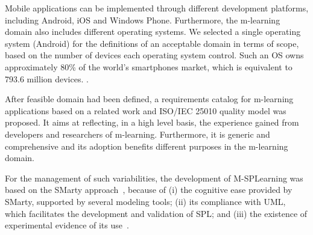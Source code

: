 Mobile applications can be implemented through different development platforms, including Android, iOS and Windows Phone. Furthermore, the m-learning domain also includes different operating systems. We selected a single operating system (Android) for the definitions of an acceptable domain in terms of scope, based on the number of devices each operating system control. Such an OS owns approximately 80\% of the world's smartphones market, which is equivalent to 793.6 million devices. \cite{llamas14}.

After feasible domain had been defined, a requirements catalog for m-learning applications based on a related work \cite{filho13} and ISO/IEC 25010 quality model was proposed. It aims at reflecting, in a high level basis, the experience gained from developers and researchers of m-learning. Furthermore, it is generic and comprehensive and its adoption benefits different purposes in the m-learning domain. 

For the management of such variabilities, the development of M-SPLear\allowbreak ning was based on the SMarty approach~\cite{oliveirajr10}, because of (i) the cognitive ease provided by SMarty, supported by several modeling tools; (ii) its compliance with UML, which facilitates the development and validation of SPL; and (iii) the existence of experimental evidence of its use~\cite{marcolino13,marcolino14a,marcolino14b,bera15}. 

